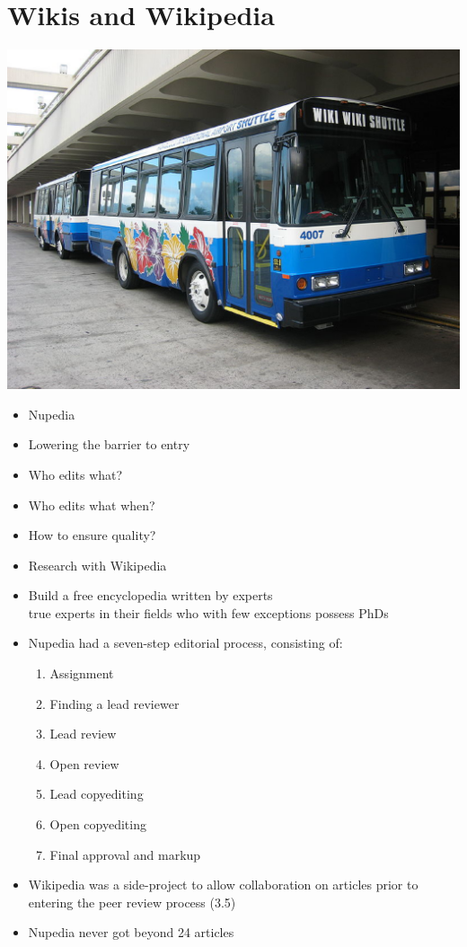 \documentclass[a4paper,landscape,headrule,footrule,xetex]{foils}
\begin{document}
\section{Wikis and Wikipedia}

\begin{center}
  \includegraphics[height=\textheight]{../pics/wiki-shuttle}
\end{center}


\begin{itemize}
\item Nupedia
\item Lowering the barrier to entry
\item Who edits what?
\item Who edits what when?
\item How to ensure quality?
\item Research with Wikipedia
\end{itemize}



\begin{itemize}
\item Build a free encyclopedia written by experts
\\ true experts in their fields who with few exceptions possess PhDs
\item Nupedia had a seven-step editorial process, consisting of:
  \begin{enumerate}
  \item  Assignment
  \item  Finding a lead reviewer
  \item  Lead review
  \item  Open review
  \item  Lead copyediting
  \item  Open copyediting
  \item  Final approval and markup
  \end{enumerate}
\item Wikipedia was a side-project to allow collaboration on articles prior to entering the peer review process (3.5)
 \item Nupedia never got beyond 24 articles
 \end{itemize}
 
\end{document}
